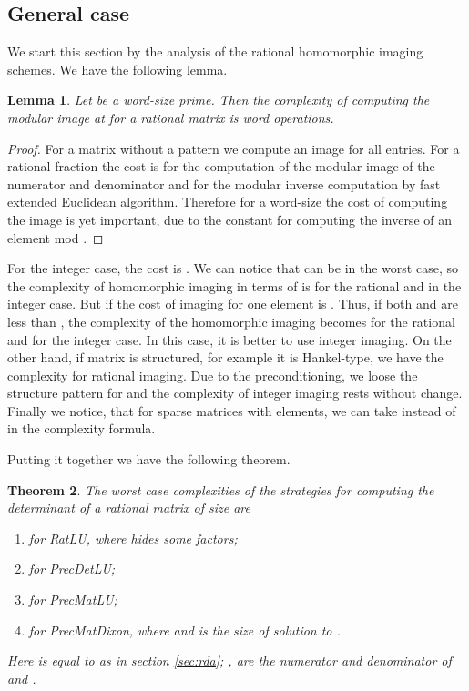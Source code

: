 \documentclass{acm_proc_article-sp}   \usepackage{graphicx,url}
\newcommand{\algrdRat}{RatLU}
\newcommand{\algrdDet}{PrecDetLU}
\newcommand{\algrdMat}{PrecMatLU}
\newcommand{\algrdDixon}{PrecMatDixon}
\newtheorem{theorem}{Theorem}[section]
\newtheorem{lemma}[theorem]{Lemma}
\begin{document}
\subsection{General case}\label{sec:gen}
We start this section by the analysis of the  rational homomorphic imaging schemes. We have the following lemma.

\begin{lemma}\label{lem:him}
Let  be a word-size prime. Then the complexity of computing the
modu\-lar image at  for a rational matrix  is
 word operations.
\end{lemma}
\begin{proof}
For a matrix without a pattern we compute an image for all 
entries. For a rational fraction the cost is  for the
computation of the modular image of the numerator and denominator and
 for the modular inverse computation by fast
extended Euclidean algorithm. Therefore for a word-size  the cost of
computing the image is  yet important, due to the constant for
computing the inverse of an element mod .
\end{proof}


For the integer case, the cost is .
We can notice that  can be  in the worst case, so the complexity of homomorphic imaging in terms of  is  for the rational and  in the integer case. But if  the cost of imaging for one element is . 
Thus, if both  and  are less than , the complexity of the homomorphic imaging becomes  for the rational and  for the integer case. In this case, it is better to use integer imaging. On the other hand, if matrix  is structured, for example it is Hankel-type, we have the complexity  for rational imaging. Due to the preconditioning, we loose the structure pattern for  and the complexity of integer imaging rests without change. Finally we notice, that for sparse matrices with  elements, we can take  instead of  in the complexity formula.

Putting it together we have the following theorem.

\begin{theorem}\label{thm:com}
The worst case complexities of the strategies for computing the determinant of a rational matrix  of size  are
\begin{enumerate}[1.]
\item 
    for \algrdRat, where  hides some  factors;
\item 
for \algrdDet;
\item 
for \algrdMat;
\item  for \algrdDixon, where  and  is
the size of solution to .
\end{enumerate}
Here  is equal to  as in  section
\ref{sec:rda}; ,  are the numerator and denominator of
 and .
\end{theorem}
\end{document}
